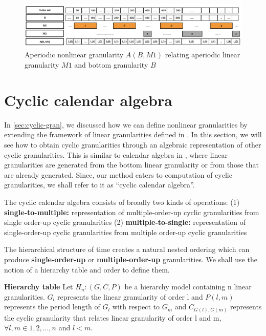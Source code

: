 \documentclass[12pt]{article}
\begin{document}
\begin{figure}

{\centering \includegraphics[width=1\linewidth]{Figs/aperiodic-example} 

}

\caption{Aperiodic nonlinear granularity $A(B, M1)$ relating aperiodic linear granularity $M1$ and bottom granularity $B$}\label{fig:aperiodic-example}
\end{figure}

\hypertarget{sec:cyclic-calendar}{%
\section{Cyclic calendar algebra}\label{sec:cyclic-calendar}}

In \autoref{sec:cyclic-gran}, we discussed how we can define nonlinear granularities by extending the framework of linear granularities defined in \citet{Bettini1998-ed}. In this section, we will see how to obtain cyclic granularities through an algebraic representation of other cyclic granularities. This is similar to calendar algebra in \citet{Ning2002-tf}, where linear granularities are generated from the bottom linear granularity or from those that are already generated. Since, our method caters to computation of cyclic granularities, we shall refer to it as ``cyclic calendar algebra''.

The cyclic calendar algebra consists of broadly two kinds of operations:
(1) \textbf{single-to-multiple:} representation of multiple-order-up cyclic granularities from single order-up cyclic granularities
(2) \textbf{multiple-to-single:} representation of single-order-up cyclic granularities from multiple order-up cyclic granularities

The hierarchical structure of time creates a natural nested ordering which can produce \textbf{single-order-up} or \textbf{multiple-order-up} granularities. We shall use the notion of a hierarchy table and order to define them.

\textbf{Hierarchy table} Let \(H_n: (G, C, P)\) be a hierarchy model containing n linear granularities. \(G_{l}\) represents the linear granularity of order l and \(P(l,m)\) represents the period length of \(G_{l}\) with respect to \(G_{m}\) and \(C_{G(l),G(m)}\) represents the cyclic granularity that relates linear granularity of order l and m, \(\forall l,m \in {1, 2, \dots,n}\) and \(l<m\).
\end{document}
